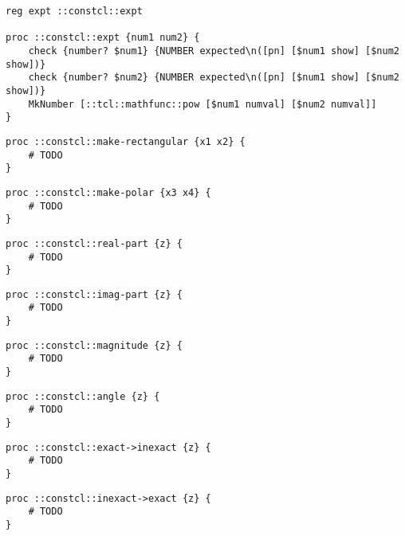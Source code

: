 \documentclass{report}
\begin{document}
\noindent\makebox[\linewidth]{\rule{\linewidth}{0.4pt}}
\begin{lstlisting}
reg expt ::constcl::expt
 
proc ::constcl::expt {num1 num2} {
    check {number? $num1} {NUMBER expected\n([pn] [$num1 show] [$num2 show])}
    check {number? $num2} {NUMBER expected\n([pn] [$num1 show] [$num2 show])}
    MkNumber [::tcl::mathfunc::pow [$num1 numval] [$num2 numval]]
}
\end{lstlisting}
\noindent\makebox[\linewidth]{\rule{\linewidth}{0.4pt}}
\noindent\makebox[\linewidth]{\rule{\linewidth}{0.4pt}}
\begin{lstlisting}
proc ::constcl::make-rectangular {x1 x2} {
    # TODO
}
\end{lstlisting}
\noindent\makebox[\linewidth]{\rule{\linewidth}{0.4pt}}
\noindent\makebox[\linewidth]{\rule{\linewidth}{0.4pt}}
\begin{lstlisting}
proc ::constcl::make-polar {x3 x4} {
    # TODO
}
\end{lstlisting}
\noindent\makebox[\linewidth]{\rule{\linewidth}{0.4pt}}
\noindent\makebox[\linewidth]{\rule{\linewidth}{0.4pt}}
\begin{lstlisting}
proc ::constcl::real-part {z} {
    # TODO
}
\end{lstlisting}
\noindent\makebox[\linewidth]{\rule{\linewidth}{0.4pt}}
\noindent\makebox[\linewidth]{\rule{\linewidth}{0.4pt}}
\begin{lstlisting}
proc ::constcl::imag-part {z} {
    # TODO
}
\end{lstlisting}
\noindent\makebox[\linewidth]{\rule{\linewidth}{0.4pt}}
\noindent\makebox[\linewidth]{\rule{\linewidth}{0.4pt}}
\begin{lstlisting}
proc ::constcl::magnitude {z} {
    # TODO
}
\end{lstlisting}
\noindent\makebox[\linewidth]{\rule{\linewidth}{0.4pt}}
\noindent\makebox[\linewidth]{\rule{\linewidth}{0.4pt}}
\begin{lstlisting}
proc ::constcl::angle {z} {
    # TODO
}
\end{lstlisting}
\noindent\makebox[\linewidth]{\rule{\linewidth}{0.4pt}}
\noindent\makebox[\linewidth]{\rule{\linewidth}{0.4pt}}
\begin{lstlisting}
proc ::constcl::exact->inexact {z} {
    # TODO
}
\end{lstlisting}
\noindent\makebox[\linewidth]{\rule{\linewidth}{0.4pt}}
\noindent\makebox[\linewidth]{\rule{\linewidth}{0.4pt}}
\begin{lstlisting}
proc ::constcl::inexact->exact {z} {
    # TODO
}
\end{lstlisting}
\noindent\makebox[\linewidth]{\rule{\linewidth}{0.4pt}}
\end{document}
